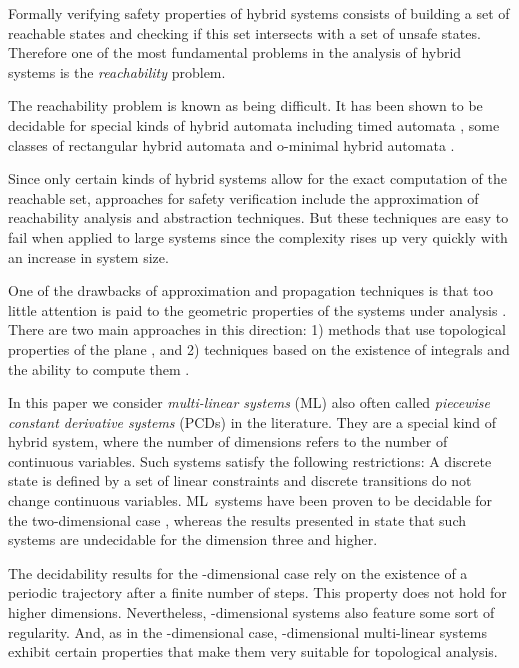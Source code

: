 \documentclass[copyright,creativecommons]{packages/eptcs}
\newcommand{\ml}{\mbox{ML}}
\begin{document}
Formally verifying safety properties of hybrid
systems consists of building a set of reachable states and checking if this
set intersects with a set of unsafe states. Therefore one of the
most fundamental problems in the analysis of hybrid systems is the
\emph{reachability} problem.

The reachability problem is known as being difficult. It has been shown to be
decidable for special kinds of hybrid automata \cite{AD94,HKPV95,LPS00,LPY99,LPY99-2} including timed automata \cite{AD94}, 
some classes of rectangular hybrid automata \cite{HKPV95} and o-minimal hybrid automata \cite{LPS00}. 


Since only  certain kinds of hybrid systems allow  for the exact computation of the reachable set,    approaches for safety verification include  the approximation of reachability analysis and  abstraction techniques. 
But these  techniques are easy to fail when applied to large systems since the complexity rises up very quickly with an increase in system size.

One of the drawbacks of approximation and propagation techniques is that too little attention is paid to the geometric properties of the systems under analysis \cite{ASY07}.  There are two main approaches in this direction: 1) methods that use topological properties of the plane \cite{MP93}, and 2) techniques based on the existence of integrals and the ability to compute them \cite{B99}. 

In this paper we consider {\it multi-linear systems} (\ml) also often called  {\it piecewise constant derivative systems} (PCDs) in the literature.  
They  are a special kind of  hybrid system, where the number of dimensions  refers to the number of continuous 
variables. Such systems satisfy the following restrictions: A discrete state
is defined by a set of linear constraints and 
 discrete transitions do not change continuous variables. 
\ml~systems have been proven to be decidable for the two-dimensional case \cite{MP93}, 
whereas the results presented in \cite{AMP95}
state that such systems are  undecidable for  the dimension three and higher.

The decidability results for the -dimensional case rely on the existence of a periodic trajectory after a finite number of steps. This property does not hold for higher dimensions.
Nevertheless, -dimensional systems also feature some sort of regularity. And, as in the -dimensional case, -dimensional multi-linear systems  exhibit  certain properties that make  them very suitable for topological analysis.  
\end{document}
